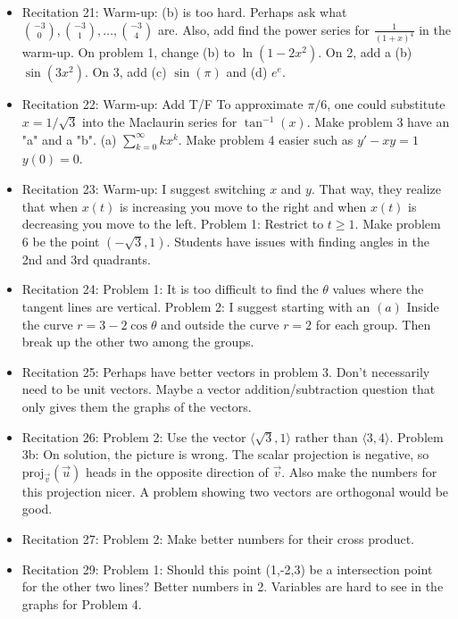 \documentclass{article}
\begin{document}
\begin{itemize}
\item Recitation 21: Warm-up: (b) is too hard. Perhaps ask what ${-3 \choose 0}, {-3 \choose 1}, \ldots, {-3\choose 4}$ are. Also, add find the power series for $\frac{1}{(1+x)^4}$ in the warm-up. On problem 1, change (b) to $\ln (1-2x^2)$. On 2, add a (b) $\sin(3x^2)$. On 3, add (c) $\sin (\pi)$ and (d) $e^e$. 
\item Recitation 22: Warm-up: Add T/F To approximate $\pi/6$, one could substitute $x=1/\sqrt{3}$ into the Maclaurin series for $\tan^{-1}(x)$. Make problem 3 have an "a" and a "b". (a) $\sum_{k=0}^{\infty} k x^k$. Make problem 4 easier such as $y'-xy=1$ $y(0)=0$. 
\item Recitation 23: Warm-up: I suggest switching $x$ and $y$. That way, they realize that when $x(t)$ is increasing you move to the right and when $x(t)$ is decreasing you move to the left. Problem 1: Restrict to $t \geq 1$. Make problem 6 be the point $(-\sqrt{3}, 1)$. Students have issues with finding angles in the 2nd and 3rd quadrants.
\item Recitation 24: Problem 1: It is too difficult to find the $\theta$ values where the tangent lines are vertical. Problem 2: I suggest starting with an $(a)$ Inside the curve $r=3-2\cos \theta$ and outside the curve $r=2$ for each group. Then break up the other two among the groups. 
\item Recitation 25: Perhaps have better vectors in problem 3. Don't necessarily need to be unit vectors. Maybe a vector addition/subtraction question that only gives them the graphs of the vectors. 
\item Recitation 26: Problem 2: Use the vector $\langle \sqrt{3}, 1 \rangle$ rather than $\langle 3, 4 \rangle$. Problem 3b: On solution, the picture is wrong. The scalar projection is negative, so $\text{proj}_{\vec{v}}(\vec{u})$ heads in the opposite direction of $\vec{v}$. Also make the numbers for this projection nicer. A problem showing two vectors are orthogonal would be good.
\item Recitation 27: Problem 2: Make better numbers for their cross product. 
\item Recitation 29: Problem 1: Should this point (1,-2,3) be a intersection point for the other two lines? Better numbers in 2. Variables are hard to see in the graphs for Problem 4. 
\end{itemize}
\end{document}
